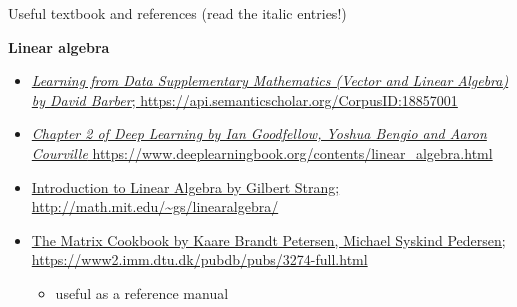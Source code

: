 \documentclass{scrartcl}
\def\tightlist{}
\begin{document}
\begin{frame}{Useful textbook and references (read the italic entries!)}
\protect\hypertarget{useful-textbook-and-references-read-the-italic-entries}{}

\textbf{Linear algebra}

\begin{itemize}
\tightlist
\item
  \href{https://api.semanticscholar.org/CorpusID:18857001}{\emph{Learning
  from Data Supplementary Mathematics (Vector and Linear Algebra) by
  David Barber}; https://api.semanticscholar.org/CorpusID:18857001}
\item
  \href{https://www.deeplearningbook.org/contents/linear_algebra.html}{\emph{Chapter
  2 of Deep Learning by Ian Goodfellow, Yoshua Bengio and Aaron
  Courville}
  https://www.deeplearningbook.org/contents/linear\_algebra.html}
\item
  \href{http://math.mit.edu/~gs/linearalgebra/}{Introduction to Linear
  Algebra by Gilbert Strang;
  http://math.mit.edu/\textasciitilde{}gs/linearalgebra/}
\item
  \href{https://www2.imm.dtu.dk/pubdb/pubs/3274-full.html}{The Matrix
  Cookbook by Kaare Brandt Petersen, Michael Syskind Pedersen;
  https://www2.imm.dtu.dk/pubdb/pubs/3274-full.html}

  \begin{itemize}
  \tightlist
  \item
    useful as a reference manual
  \end{itemize}
\end{itemize}

\end{frame}
\end{document}
